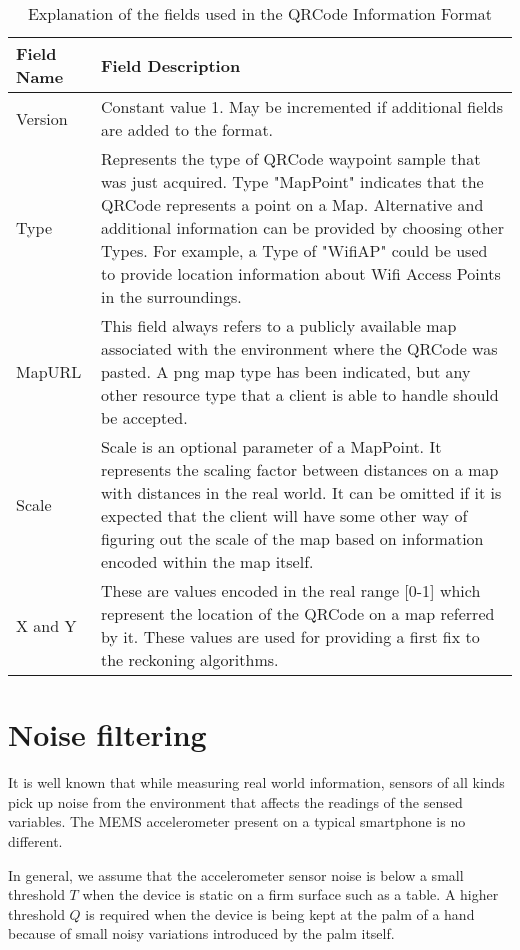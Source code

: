 \begin{table}
\centering
\begin{tabular}{p{1in} p{4in}}
\hline
\hline
Field Name      &       Field Description \\
\hline
Version         & Constant value 1. May be incremented if additional fields are added to the format. \\
Type            & Represents the type of QRCode waypoint sample that was just acquired. Type "MapPoint" indicates that the QRCode represents a point on a Map. Alternative and  additional information can be provided by choosing other Types. For example,  a Type of "WifiAP" could be used to provide location information about  Wifi Access Points in the surroundings. \\
MapURL          & This field always refers to a publicly available map associated with the environment where  the QRCode was pasted. A png map type has been indicated, but any other resource type that  a client is able to handle should be accepted. \\
Scale           & Scale is an optional parameter of a MapPoint. It represents the scaling factor between distances on a map with distances in the real world. It can be omitted if it is expected that the  client will have some other way of figuring out the scale of the map based on information encoded within the map itself. \\
X and Y         & These are values encoded in the real range [0-1] which represent the location of the QRCode on a map referred by it. These values are used for providing a first fix to the  reckoning algorithms.  \\
\hline
\end{tabular}
\caption{Explanation of the fields used in the QRCode Information Format\label{tbl:QRCode_fields_table}}
\end{table}

\section{Noise filtering\label{sec:NoiseClamping}}

It is well known that while measuring real world information, sensors of all 
kinds pick up noise from the environment that affects the readings of the 
sensed variables. The MEMS accelerometer present on a typical smartphone is 
no different. 

In general, we assume that the accelerometer sensor noise is below a small 
threshold $T$ when the device is static on a firm surface such as a table. 
A higher threshold $Q$ is required when the device is being kept at the palm of 
a hand because of small noisy variations introduced by the palm itself.

